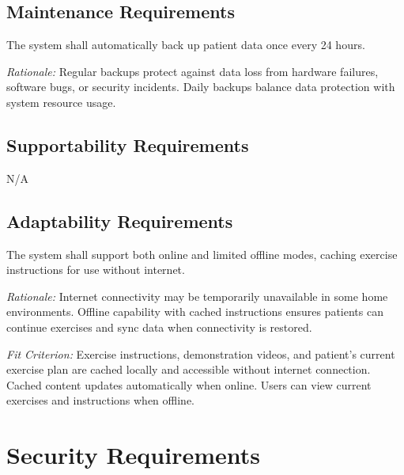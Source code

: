 \documentclass[12pt]{article}
\newcommand{\rationale}[1]{\par\emph{Rationale:} #1}
\newcommand{\fitcrit}[1]{\par\emph{Fit Criterion:} #1}
\begin{document}
\subsection{Maintenance Requirements}
\begin{reqlist}
	\item[MS-MNT 1.] The system shall automatically back up patient data once every 24 hours.
	\rationale{Regular backups protect against data loss from hardware failures, software bugs, or security incidents. Daily backups balance data protection with system resource usage.}
\end{reqlist}

\subsection{Supportability Requirements}
N/A

\subsection{Adaptability Requirements}
\begin{reqlist}
	\item[MS-AD 1.] The system shall support both online and limited offline modes, caching exercise instructions for use without internet.
	\rationale{Internet connectivity may be temporarily unavailable in some home environments. Offline capability with cached instructions ensures patients can continue exercises and sync data when connectivity is restored.}
	\fitcrit{Exercise instructions, demonstration videos, and patient's current exercise plan are cached locally and accessible without internet connection. Cached content updates automatically when online. Users can view current exercises and instructions when offline.}
\end{reqlist}

\section{Security Requirements}
\end{document}
